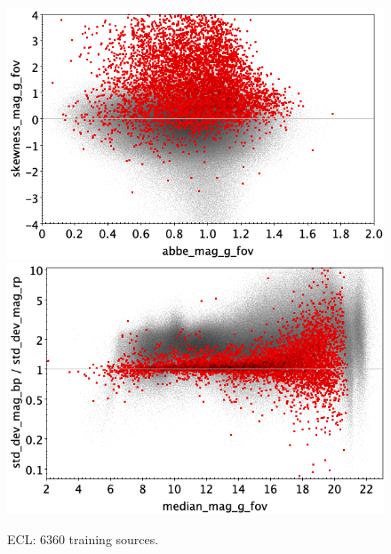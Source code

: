 \documentclass[longauth]{aa}
\begin{document}
\begin{appendix}
\begin{figure}
\vspace{4mm}
 \includegraphics[width=0.45\hsize]{figures/appendix/ECL_trn_ask.png}  %
\hspace{2mm}
 \includegraphics[width=0.45\hsize]{figures/appendix/ECL_trn_msdr.png}  \\ %
\vspace{4mm}
 \caption{ECL: 6360 training sources.}  
 \label{fig:app:ECL_trn}
\end{figure}


\end{appendix}
\end{document}
